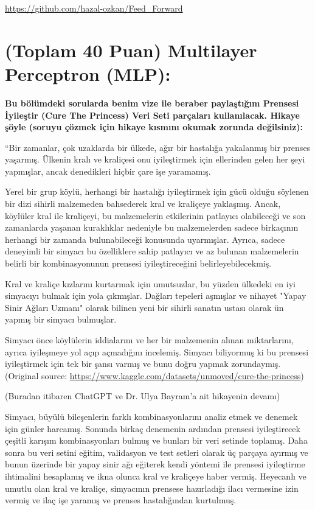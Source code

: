 \documentclass[11pt]{article}
\begin{document}
\begin{itemize}
\begin{itemize}
\url{https://github.com/hazal-ozkan/Feed_Forward}

\section{(Toplam 40 Puan) Multilayer Perceptron (MLP):} 
\textbf{Bu bölümdeki sorularda benim vize ile beraber paylaştığım Prensesi İyileştir (Cure The Princess) Veri Seti parçaları kullanılacak. Hikaye şöyle (soruyu çözmek için hikaye kısmını okumak zorunda değilsiniz):} 

``Bir zamanlar, çok uzaklarda bir ülkede, ağır bir hastalığa yakalanmış bir prenses yaşarmış. Ülkenin kralı ve kraliçesi onu iyileştirmek için ellerinden gelen her şeyi yapmışlar, ancak denedikleri hiçbir çare işe yaramamış.

Yerel bir grup köylü, herhangi bir hastalığı iyileştirmek için gücü olduğu söylenen bir dizi sihirli malzemeden bahsederek kral ve kraliçeye yaklaşmış. Ancak, köylüler kral ile kraliçeyi, bu malzemelerin etkilerinin patlayıcı olabileceği ve son zamanlarda yaşanan kuraklıklar nedeniyle bu malzemelerden sadece birkaçının herhangi bir zamanda bulunabileceği konusunda uyarmışlar. Ayrıca, sadece deneyimli bir simyacı bu özelliklere sahip patlayıcı ve az bulunan malzemelerin belirli bir kombinasyonunun prensesi iyileştireceğini belirleyebilecekmiş.

Kral ve kraliçe kızlarını kurtarmak için umutsuzlar, bu yüzden ülkedeki en iyi simyacıyı bulmak için yola çıkmışlar. Dağları tepeleri aşmışlar ve nihayet "Yapay Sinir Ağları Uzmanı" olarak bilinen yeni bir sihirli sanatın ustası olarak ün yapmış bir simyacı bulmuşlar.

Simyacı önce köylülerin iddialarını ve her bir malzemenin alınan miktarlarını, ayrıca iyileşmeye yol açıp açmadığını incelemiş. Simyacı biliyormuş ki bu prensesi iyileştirmek için tek bir şansı varmış ve bunu doğru yapmak zorundaymış. (Original source: \url{https://www.kaggle.com/datasets/unmoved/cure-the-princess})

(Buradan itibaren ChatGPT ve Dr. Ulya Bayram'a ait hikayenin devamı)

Simyacı, büyülü bileşenlerin farklı kombinasyonlarını analiz etmek ve denemek için günler harcamış. Sonunda birkaç denemenin ardından prensesi iyileştirecek çeşitli karışım kombinasyonları bulmuş ve bunları bir veri setinde toplamış. Daha sonra bu veri setini eğitim, validasyon ve test setleri olarak üç parçaya ayırmış ve bunun üzerinde bir yapay sinir ağı eğiterek kendi yöntemi ile prensesi iyileştirme ihtimalini hesaplamış ve ikna olunca kral ve kraliçeye haber vermiş. Heyecanlı ve umutlu olan kral ve kraliçe, simyacının prensese hazırladığı ilacı vermesine izin vermiş ve ilaç işe yaramış ve prenses hastalığından kurtulmuş.


\end{itemize}
\end{itemize}
\end{document}
